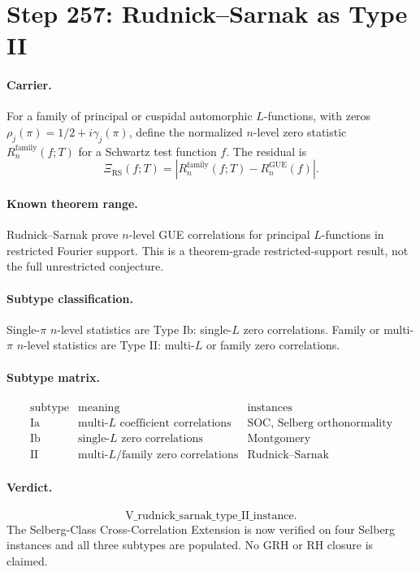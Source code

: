 \section*{Step 257: Rudnick--Sarnak as Type II}

\paragraph{Carrier.}
For a family of principal or cuspidal automorphic \(L\)-functions, with zeros
\(\rho_j(\pi)=1/2+i\gamma_j(\pi)\), define the normalized \(n\)-level zero
statistic \(R_n^{\mathrm{family}}(f;T)\) for a Schwartz test function \(f\).
The residual is
\[
\Xi_{\mathrm{RS}}(f;T)
=\left|R_n^{\mathrm{family}}(f;T)-R_n^{\mathrm{GUE}}(f)\right|.
\]

\paragraph{Known theorem range.}
Rudnick--Sarnak prove \(n\)-level GUE correlations for principal
\(L\)-functions in restricted Fourier support.  This is a theorem-grade
restricted-support result, not the full unrestricted conjecture.

\paragraph{Subtype classification.}
Single-\(\pi\) \(n\)-level statistics are Type Ib: single-\(L\) zero
correlations.  Family or multi-\(\pi\) \(n\)-level statistics are Type II:
multi-\(L\) or family zero correlations.

\paragraph{Subtype matrix.}
\[
\begin{array}{c|c|c}
\text{subtype} & \text{meaning} & \text{instances}\\
\hline
\text{Ia} & \text{multi-}L\text{ coefficient correlations}
& \text{SOC, Selberg orthonormality}\\
\text{Ib} & \text{single-}L\text{ zero correlations}
& \text{Montgomery}\\
\text{II} & \text{multi-}L\text{/family zero correlations}
& \text{Rudnick--Sarnak}
\end{array}
\]

\paragraph{Verdict.}
\[
\mathrm{V\_rudnick\_sarnak\_type\_II\_instance}.
\]
The Selberg-Class Cross-Correlation Extension is now verified on four
Selberg instances and all three subtypes are populated.  No GRH or RH closure
is claimed.
